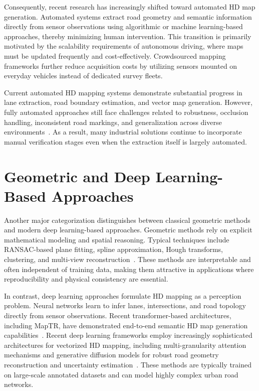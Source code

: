 Consequently, recent research has increasingly shifted toward automated HD map generation. Automated systems extract road geometry and semantic information directly from sensor observations using algorithmic or machine learning-based approaches, thereby minimizing human intervention. This transition is primarily motivated by the scalability requirements of autonomous driving, where maps must be updated frequently and cost-effectively. Crowdsourced mapping frameworks further reduce acquisition costs by utilizing sensors mounted on everyday vehicles instead of dedicated survey fleets.

Current automated HD mapping systems demonstrate substantial progress in lane extraction, road boundary estimation, and vector map generation. However, fully automated approaches still face challenges related to robustness, occlusion handling, inconsistent road markings, and generalization across diverse environments~\cite{OcclusionHandlingSDMapFusion}. As a result, many industrial solutions continue to incorporate manual verification stages even when the extraction itself is largely automated.

\section{Geometric and Deep Learning-Based Approaches}
\label{sec:geometric_dl}

Another major categorization distinguishes between classical geometric methods and modern deep learning-based approaches. Geometric methods rely on explicit mathematical modeling and spatial reasoning. Typical techniques include RANSAC-based plane fitting, spline approximation, Hough transforms, clustering, and multi-view reconstruction~\cite{isprs-archives-XLII-2-W13-1089-2019,RANSAC}. These methods are interpretable and often independent of training data, making them attractive in applications where reproducibility and physical consistency are essential.

In contrast, deep learning approaches formulate HD mapping as a perception problem. Neural networks learn to infer lanes, intersections, and road topology directly from sensor observations. Recent transformer-based architectures, including MapTR, have demonstrated end-to-end semantic HD map generation capabilities~\cite{mapTR}. Recent deep learning frameworks employ increasingly sophisticated architectures for vectorized HD mapping, including multi-granularity attention mechanisms and generative diffusion models for robust road geometry reconstruction and uncertainty estimation~\cite{yang2025mgmapnet, monninger2025mapdiffusiongenerativediffusionvectorized}.
These methods are typically trained on large-scale annotated datasets and can model highly complex urban road networks.

